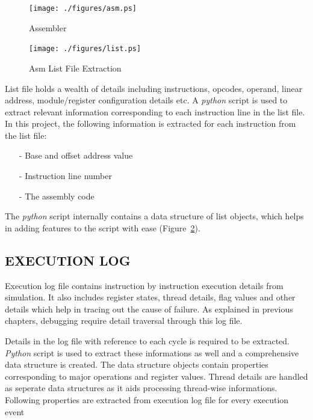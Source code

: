 
\begin{figure}[h]
\centering
\texttt{[image: ./figures/asm.ps]}
\caption{Assembler}
\label{impl.tex:assembler}
\end{figure}


\begin{figure}[h]
\centering
\texttt{[image: ./figures/list.ps]}
\caption{Asm List File Extraction}
\label{impl.tex:listextr}
\end{figure}

List file holds a wealth of details including instructions, opcodes, operand, linear address, module/register configuration details etc. A {\it python} script is used to extract relevant information corresponding to each instruction line in the list file. In this project, the following information is extracted for each instruction from the  list file:
\begin{itemize}
	\item[-] Base and offset address value
	\item[-] Instruction line number
	\item[-] The assembly code
\end{itemize}

The {\it python} script internally contains a data structure of list objects, which helps in adding features to the script with ease (Figure~\ref{impl.tex:listextr}). 

\subsection {EXECUTION LOG}
Execution log file contains instruction by instruction execution details from simulation. It also includes register states, thread details, flag values and other details which help in tracing out the cause of failure. As explained in previous chapters, debugging require detail traversal through this log file. 

Details in the log file with reference to each cycle is required to be extracted. {\it Python} script is used to extract these informations as well and a comprehensive data structure is created. The data structure objects contain properties corresponding to major operations and register values. Thread details are handled as seperate data structures as it aids processing thread-wise informations. Following properties are extracted from execution log file for every execution event

